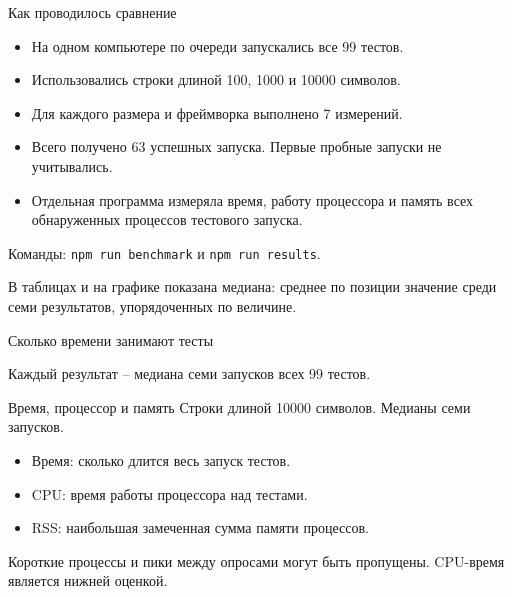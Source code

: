 \documentclass[aspectratio=169,11pt]{beamer}
\begin{document}
\begin{frame}{Как проводилось сравнение}
\begin{itemize}
\item На одном компьютере по очереди запускались все 99 тестов.
\item Использовались строки длиной 100, 1000 и 10000 символов.
\item Для каждого размера и фреймворка выполнено 7 измерений.
\item Всего получено 63 успешных запуска. Первые пробные запуски не учитывались.
\item Отдельная программа измеряла время, работу процессора и память всех обнаруженных процессов тестового запуска.
\end{itemize}
\vspace{3mm}
Команды: \texttt{npm run benchmark} и \texttt{npm run results}.\par
В таблицах и на графике показана медиана: среднее по позиции значение среди семи результатов, упорядоченных по величине.
\end{frame}
\begin{frame}{Сколько времени занимают тесты}
\centering
{}\par
\small Каждый результат -- медиана семи запусков всех 99 тестов.
\end{frame}
\begin{frame}{Время, процессор и память}
Строки длиной 10000 символов. Медианы семи запусков.
\begin{table}

\end{table}
\begin{itemize}
\item Время: сколько длится весь запуск тестов.
\item CPU: время работы процессора над тестами.
\item RSS: наибольшая замеченная сумма памяти процессов.
\end{itemize}
\small Короткие процессы и пики между опросами могут быть пропущены. CPU-время является нижней оценкой.
\end{frame}
\end{document}
